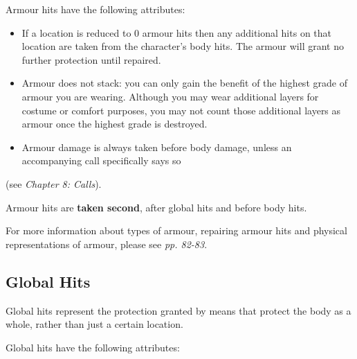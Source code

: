 \documentclass{scrbook}
\begin{document}
Armour hits have the following attributes:

\begin{itemize}
\item If a location is reduced to 0 armour hits then any additional hits on that location are taken from the character's body hits. The armour will grant no further protection until repaired.

\item Armour does not stack: you can only gain the benefit of the highest grade of armour you are wearing. Although you may wear additional layers for costume or comfort purposes, you may not count those additional layers as armour once the highest grade is destroyed.

\item Armour damage is always taken before body damage, unless an accompanying call specifically says so

\end{itemize}
(see \textit{Chapter 8: Calls}).

Armour hits are \textbf{taken second}, after global hits and before body hits.

For more information about types of armour, repairing armour hits and physical representations of armour, please see \textit{pp. 82-83}.

\subsection{Global Hits}

Global hits represent the protection granted by means that protect the body as a whole, rather than just a certain location.

Global hits have the following attributes:
\end{document}

